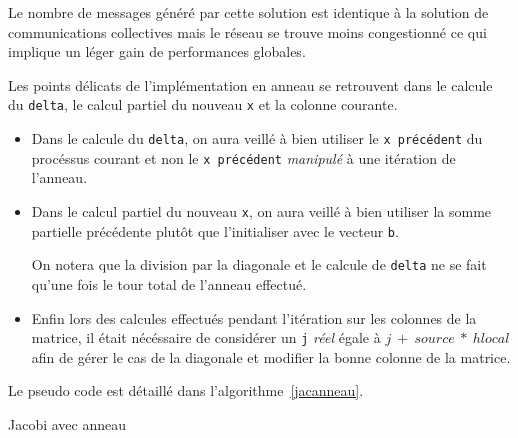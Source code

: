 \documentclass[a4paper]{article}
\begin{document}
Le nombre de messages généré par cette solution est identique à la solution de
communications collectives mais le réseau se trouve moins congestionné ce qui
implique un léger gain de performances globales.

Les points délicats de l'implémentation en anneau se retrouvent dans le 
calcule du \texttt{delta}, le calcul partiel du nouveau \texttt{x} et la colonne
courante. 
\begin{itemize}
\item Dans le calcule du \texttt{delta}, on aura veillé à bien utiliser le 
\texttt{x précédent} du procéssus courant et non le \texttt{x précédent} 
\emph{manipulé} à une itération de l'anneau. 
\item Dans le calcul partiel du nouveau \texttt{x}, on aura veillé à bien utiliser 
la somme partielle précédente plutôt que l'initialiser avec le vecteur \texttt{b}. 

On notera que la division par la diagonale et le calcule de \texttt{delta} ne se 
fait qu'une fois le tour total de l'anneau effectué. 

\item Enfin lors des calcules effectués pendant l'itération sur les 
colonnes de la matrice, il était nécéssaire de considérer un \texttt{j} \emph{réel}
égale à $j~+~source~*~hlocal$ afin de gérer le cas de la diagonale et modifier la 
bonne colonne de la matrice.\\
\end{itemize}

Le pseudo code est détaillé dans l'algorithme~\ref{jacanneau}.

\begin{algorithm}[H]
 \SetLine %
 
 \caption{\label{jacanneau}Jacobi avec anneau}
\end{algorithm}
\end{document}
